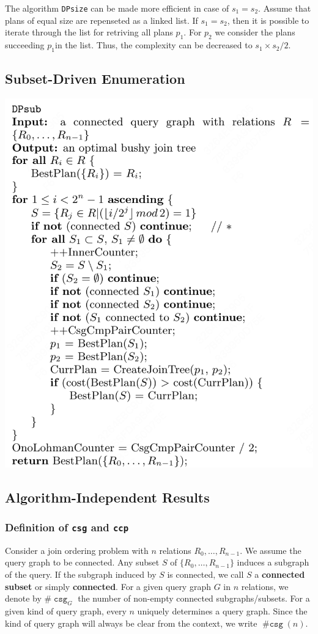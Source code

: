 \documentclass[11pt]{article}
\DeclareMathOperator{\csg}{\texttt{csg}}
\DeclareMathOperator{\ncsg}{\#\texttt{csg}}
\begin{document}
The algorithm \texttt{DPsize} can be made more efficient in case of \(s_1=s_2\). Assume that plans of equal
size are repenseted as a linked list. If \(s_1=s_2\), then it is possible to iterate through the list
for retriving all plans \(p_1\). For \(p_2\) we consider the plans succeeding \(p_1\)in the list.
Thus, the complexity can be decreased to \(s_1\times s_2/2\).
\subsection{Subset-Driven Enumeration}
\label{sec:org5610336}
\begin{center}
\includegraphics[width=.8\textwidth]{../../images/papers/99.png}
\end{center}
\subsection{Algorithm-Independent Results}
\label{sec:orgc876a0f}
\subsubsection{Definition of \texttt{csg} and \texttt{ccp}}
\label{sec:orgae5c0aa}
Consider a join ordering problem with \(n\) relations \(R_0,\dots,R_{n-1}\). We assume the query graph
to be connected. Any subset \(S\) of \(\{R_0,\dots,R_{n-1}\}\) induces a subgraph of the query. If the
subgraph induced by \(S\) is connected, we call \(S\) a \textbf{connected subset} or simply \textbf{connected}. For a
given query graph \(G\) in \(n\) relations, we denote by \(\#\csg_G\) the number of non-empty
connected subgraphs/subsets. For a given kind of query graph, every \(n\) uniquely determines a query
graph. Since the kind of query graph will always be clear from the context, we write \(\ncsg(n)\).
\end{document}
